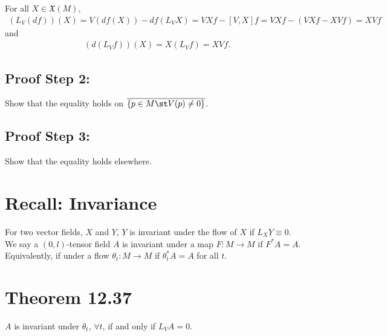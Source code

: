 \documentclass[11pt]{article}
\begin{document}
For all \(X\in\mathfrak{X}(M)\),\\
\begin{align*}
  (L_{V}(df))(X)
  =V(df(X))-df(L_{V}X)
  =VXf-[V,X]f
  =VXf-(VXf-XVf)=XVf
\end{align*}
and\\
\begin{align*}
  (d(L_{V}f))(X)=X(L_{V}f)=XVf.
\end{align*}
\subsection*{Proof Step 2:}
\label{sec:org2a973d3}
Show that the equality holds on \(\overline{\{p\in M\st V(p)\neq0\}}\).\\
\subsection*{Proof Step 3:}
\label{sec:org83a0e9f}
Show that the equality holds elsewhere.\\
\section*{Recall: Invariance}
\label{sec:org58721af}
For two vector fields, \(X\) and \(Y\), \(Y\) is invariant under the flow of \(X\) if \(L_{X}Y\equiv 0\).\\
We say a \((0,l)\)-tensor field \(A\) is invariant under a map \(F:M\to M\) if \(F^{*}A=A\). Equivalently, if under a flow \(\theta_{t}:M\to M\) if \(\theta_{t}^{*}A=A\) for all \(t\).\\
\section*{Theorem 12.37}
\label{sec:orgc8fb23e}
\(A\) is invariant under \(\theta_{t}\), \(\forall t\), if and only if \(L_{V}A=0\).\\
\end{document}
